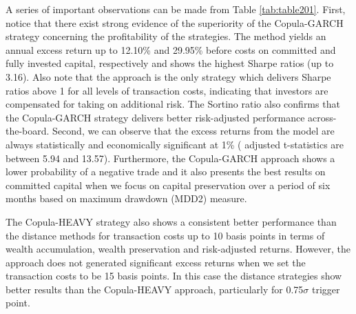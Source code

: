\documentclass[a4paper,12pt]{report}
\begin{document}
A series of important observations can be made from Table \ref{tab:table201}. First, notice that there exist strong evidence of the superiority of the Copula-GARCH strategy concerning the profitability of the strategies. The method yields an annual excess return up to 12.10\% and 29.95\% before costs on committed and fully invested capital, respectively and shows the highest Sharpe ratios (up to 3.16). Also note that the approach is the only strategy which delivers Sharpe ratios above 1 for all levels of transaction costs, indicating that investors are compensated for taking on additional risk. The Sortino ratio also confirms that the Copula-GARCH strategy delivers better risk-adjusted performance across-the-board. Second, we can observe that the excess returns from the model are always statistically and economically significant at 1\% (\citet*{nw87} adjusted t-statistics are between 5.94 and 13.57). Furthermore, the Copula-GARCH approach shows a lower probability of a negative trade and it also presents the best results on committed capital when we focus on capital preservation over a period of six months based on maximum drawdown (MDD2) measure.

The Copula-HEAVY strategy also shows a consistent better performance than the distance methods for transaction costs up to 10 basis points in terms of wealth accumulation, wealth preservation and risk-adjusted returns. However, the approach does not generated significant excess returns when we set the transaction costs to be 15 basis points. In this case the distance strategies show better results than the Copula-HEAVY approach, particularly for 0.75$\sigma$ trigger point.
\end{document}
